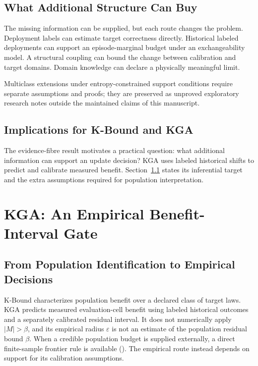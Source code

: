 \subsection{What Additional Structure Can Buy}
\label{sec:compact-additional-structure}

The missing information can be supplied, but each route changes the problem. Deployment labels can
estimate target correctness directly. Historical labeled deployments can support an
episode-marginal budget under an exchangeability model. A structural coupling can bound the change
between calibration and target domains. Domain knowledge can declare a physically meaningful
limit.

Multiclass extensions under entropy-constrained support conditions require separate assumptions and proofs; they are preserved as unproved exploratory research notes outside the maintained claims of this manuscript.

\subsection{Implications for K-Bound and KGA}

The evidence-fibre result motivates a practical question: what additional information can support
an update decision? KGA uses labeled historical shifts to predict and calibrate measured benefit.
Section~\ref{sec:compact-bridge} states its inferential target and the extra assumptions required
for population interpretation.

\section{KGA: An Empirical Benefit-Interval Gate}
\label{sec:compact-kga}

\subsection{From Population Identification to Empirical Decisions}
\label{sec:compact-bridge}

K-Bound characterizes population benefit over a declared class of target laws. KGA predicts
measured evaluation-cell benefit using labeled historical outcomes and a separately calibrated
residual interval. It does not numerically apply $|M|>\beta$, and its empirical radius
$\varepsilon$ is not an estimate of the population residual bound $\beta$. When a credible
population budget is supplied externally, a direct finite-sample frontier rule is available
().
The empirical route instead depends on support for its calibration assumptions.

